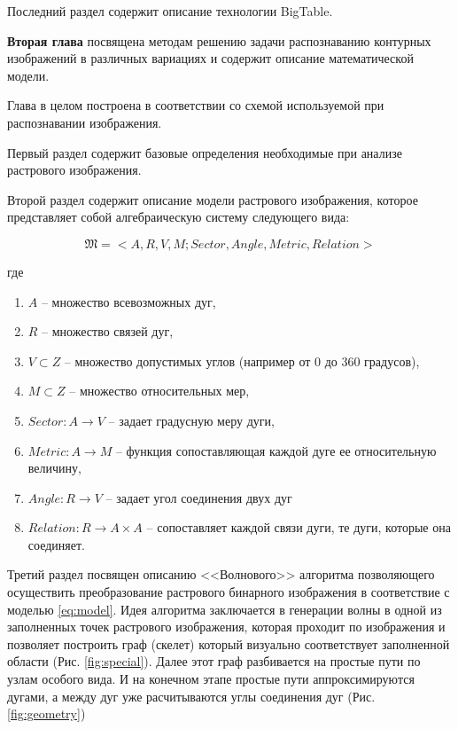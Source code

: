 Последний раздел содержит описание технологии BigTable.

\textbf{Вторая глава} посвящена методам решению  задачи распознаванию контурных изображений в различных вариациях и содержит описание математической модели.

Глава в целом построена в соответствии со схемой используемой при распознавании изображения.
 
Первый раздел содержит базовые определения необходимые при анализе растрового изображения.
 
Второй раздел содержит описание модели растрового изображения, которое представляет собой алгебраическую систему следующего вида:

\begin{equation}
\mathfrak{M} = < A, R, V, M; Sector, Angle, Metric, Relation >
\label{eq:model}
\end{equation}

\noindent
где
\begin{enumerate}
\item[] $A$ -- множество всевозможных дуг,
\item[] $R$ -- множество связей дуг,
\item[] $V \subset Z$ -- множество допустимых углов (например от 0 до 360 градусов),
\item[] $M \subset Z$ -- множество относительных мер,
\item[] $Sector: A \rightarrow V$ -- задает градусную меру дуги,
\item[] $Metric: A \rightarrow M$ -- функция сопоставляющая каждой дуге ее относительную величину,
\item[] $Angle: R \rightarrow V$ -- задает угол соединения двух дуг
\item[] $Relation: R \rightarrow A \times A$ -- сопоставляет каждой связи дуги, те дуги, которые она соединяет.
\end{enumerate}

Третий раздел посвящен описанию <<Волнового>> алгоритма позволяющего осуществить преобразование растрового бинарного изображения в соответствие с моделью \ref{eq:model}. Идея алгоритма заключается в генерации волны в одной из заполненных точек растрового изображения, которая проходит по изображения и позволяет построить граф (скелет) который визуально соответствует заполненной области (Рис. \ref{fig:special}). Далее этот граф разбивается на простые пути по узлам особого вида. И на конечном этапе простые пути аппроксимируются дугами, а между дуг уже расчитываются углы соединения дуг (Рис. \ref{fig:geometry})

